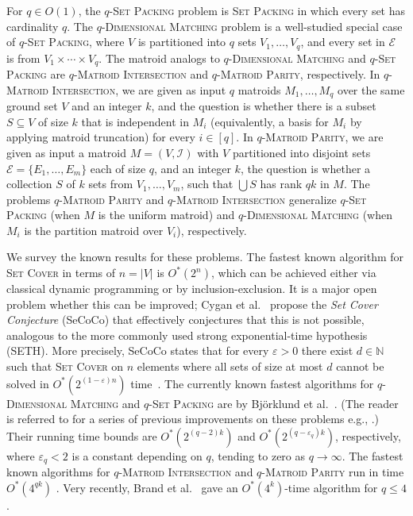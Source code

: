 \documentclass[10pt,a4paper]{article}
\newcommand{\N}{\ensuremath{\mathbb N}\xspace}
\newcommand{\cI}{\ensuremath{\mathcal I}\xspace}
\newcommand{\cE}{\ensuremath{\mathcal E}\xspace}
\begin{document}
For $q \in O(1)$, 
the \textsc{$q$-Set Packing} problem is \textsc{Set Packing} in which every set has cardinality $q$.
The \textsc{$q$-Dimensional Matching} problem is a well-studied special case of \textsc{$q$-Set Packing}, where $V$ is partitioned into $q$ sets $V_1, \dots, V_q$, and every set in $\cE$ is from $V_1 \times \cdots \times V_q$.
The matroid analogs to \textsc{$q$-Dimensional Matching} and \textsc{$q$-Set Packing} are \textsc{$q$-Matroid Intersection} and \textsc{$q$-Matroid Parity}, respectively.
In \textsc{$q$-Matroid Intersection}, we are given as input $q$ matroids $M_1, \dots, M_q$ over the same ground set $V$ and an integer $k$, and the question is whether there is a subset $S \subseteq V$ of size $k$ that is independent in $M_i$ (equivalently, a basis for $M_i$ by applying matroid truncation) for every $i \in [q]$.
In \textsc{$q$-Matroid Parity}, we are given as input a matroid $M = (V, \cI)$ with $V$ partitioned into disjoint sets $\cE = \{ E_1, \dots, E_m \}$ each of size $q$, and an integer $k$, the question is whether a collection $S$ of $k$ sets from $V_1, \dots, V_m$, such that $\bigcup S$ has rank $qk$ in $M$.
The problems \textsc{$q$-Matroid Parity} and \textsc{$q$-Matroid Intersection} generalize \textsc{$q$-Set Packing} (when $M$ is the uniform matroid) and \textsc{$q$-Dimensional Matching} (when $M_i$ is the partition matroid over $V_i$), respectively.

We survey the known results for these problems.
The fastest known algorithm for \textsc{Set Cover}
in terms of $n=|V|$ is $O^*(2^n)$, which can be achieved either via
classical dynamic programming or by inclusion-exclusion. It is a major
open problem whether this can be improved; Cygan et al.~\cite{CyganDLMNOPSW16seth}
propose the \emph{Set Cover Conjecture} (SeCoCo) that effectively
conjectures that this is not possible, analogous to the more commonly
used strong exponential-time hypothesis (SETH).
More precisely, SeCoCo states that for every $\varepsilon > 0$
there exist $d \in \N$ such that \textsc{Set Cover}
on $n$ elements where all sets of size at most $d$
cannot be solved in $O^*(2^{(1-\varepsilon)n})$ time~\cite{CyganDLMNOPSW16seth}.
The currently known fastest algorithms for \textsc{$q$-Dimensional Matching} and \textsc{$q$-Set Packing} are by Bj\"orklund et al.~\cite{BjorklundHKK17narrow}.
(The reader is referred to \cite{BjorklundHKK17narrow} for a series of previous improvements on these problems e.g., \cite{Chen09,Koutis08ICALP,KoutisW09limits}.)
Their running time bounds are $O^*(2^{(q-2)k})$ and $O^*(2^{(q-\varepsilon_q)k})$, respectively, where $\varepsilon_q < 2$ is a constant depending on $q$, tending to zero as $q \to \infty$.
The fastest known algorithms for \textsc{$q$-Matroid Intersection} and \textsc{$q$-Matroid Parity} run in time $O^*(4^{qk})$ \cite{BrandP21}.
Very recently, Brand et al.~\cite{BrandKS23} gave an $O^*(4^k)$-time algorithm for $q \le 4$.
\end{document}
